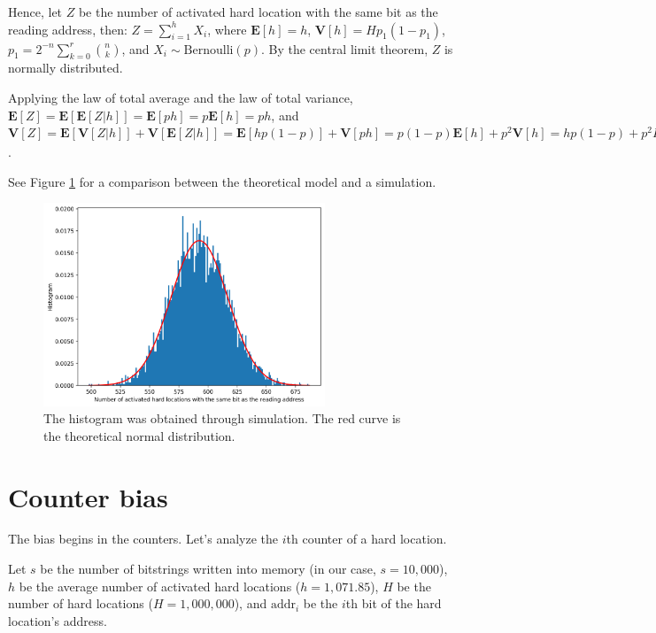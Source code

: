 \documentclass[12pt]{article}
\begin{document}
Hence, let $Z$ be the number of activated hard location with the same bit as the reading address, then: $Z = \sum_{i=1}^{h} X_i$, where $\mathbf{E}[h] = h$, $\mathbf{V}[h] = H p_1 (1-p_1)$, $p_1 = 2^{-n} \sum_{k=0}^{r} \binom{n}{k}$, and $X_i \sim \text{Bernoulli}(p)$. By the central limit theorem, $Z$ is normally distributed.

Applying the law of total average and the law of total variance, $\mathbf{E}[Z] = \mathbf{E}[\mathbf{E}[Z | h]] = \mathbf{E}[ph] = p \mathbf{E}[h] = ph$, and $\mathbf{V}[Z] = \mathbf{E}[\mathbf{V}[Z|h]] + \mathbf{V}[\mathbf{E}[Z|h]] = \mathbf{E}[hp(1-p)] + \mathbf{V}[ph] = p(1-p) \mathbf{E}[h] + p^2 \mathbf{V}[h] = hp(1-p) + p^2 H p_1 (1-p_1)$.

See Figure \ref{fig:sdm-same-bit-histogram} for a comparison between the theoretical model and a simulation.

\begin{figure}[h!]
  \centering
  \includegraphics[width=0.75\textwidth]{./images02/autocorrelation/same-bit-histogram.png}

  \caption{The histogram was obtained through simulation. The red curve is the theoretical normal distribution.}
  \label{fig:sdm-same-bit-histogram}
\end{figure}

\section{Counter bias}

The bias begins in the counters. Let's analyze the $i$th counter of a hard location.

Let $s$ be the number of bitstrings written into memory (in our case, $s=10,000$), $h$ be the average number of activated hard locations ($h=1,071.85$), $H$ be the number of hard locations ($H=1,000,000$), and $\text{addr}_i$ be the $i$th bit of the hard location's address.
\end{document}
